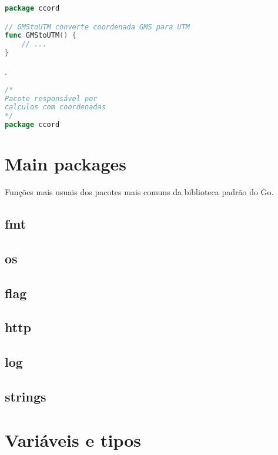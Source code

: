 \documentclass{apostila}
\begin{document}
\begin{lstlisting}[language=go,caption={Documentando pacote, variaveis, funcoes e tipos}]
package ccord

// GMStoUTM converte coordenada GMS para UTM
func GMStoUTM() {
    // ...
}
\end{lstlisting}

.

\begin{lstlisting}[language=go,caption=Documentando pacotes]
/*
Pacote responsável por
calculos com coordenadas
*/
package ccord
\end{lstlisting}













\chapter{Main packages}
\label{main lib}
Funções mais usuais dos pacotes mais comuns da biblioteca padrão do Go.
\section{fmt}
\section{os}
\section{flag}
\section{http}
\section{log}
\section{strings}

\chapter{Variáveis e tipos}
\end{document}

